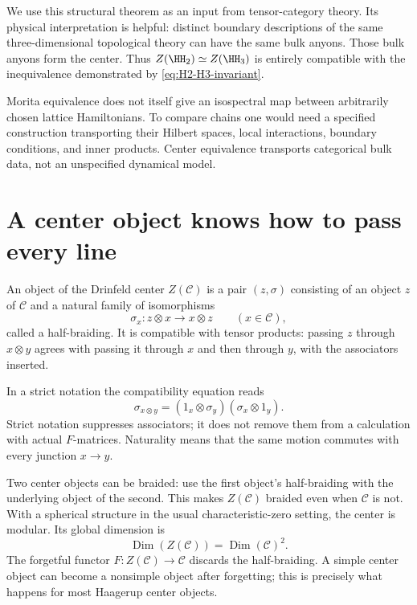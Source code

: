 We use this structural theorem as an input from tensor-category
theory.  Its physical interpretation is helpful: distinct boundary
descriptions of the same three-dimensional topological theory can
have the same bulk anyons.  Those bulk anyons form the center.
Thus $Z(\HH_2)\simeq Z(\HH_3)$ is entirely compatible with
the inequivalence demonstrated by \eqref{eq:H2-H3-invariant}.

Morita equivalence does not itself give an isospectral map between
arbitrarily chosen lattice Hamiltonians.  To compare chains one
would need a specified construction transporting their Hilbert
spaces, local interactions, boundary conditions, and inner products.
Center equivalence transports categorical bulk data, not an
unspecified dynamical model.

\section{A center object knows how to pass every line}

\begin{definition}
An object of the Drinfeld center $Z(\mathcal C)$ is a pair
$(z,\sigma)$ consisting of an object $z$ of $\mathcal C$ and
a natural family of isomorphisms
\[
 \sigma_x:z\otimes x\longrightarrow x\otimes z
 \qquad(x\in\mathcal C),
\]
called a half-braiding.  It is compatible with tensor products:
passing $z$ through $x\otimes y$ agrees with passing it through
$x$ and then through $y$, with the associators inserted.
\end{definition}

In a strict notation the compatibility equation reads
\begin{equation}
 \sigma_{x\otimes y}
 =(1_x\otimes\sigma_y)(\sigma_x\otimes1_y).
 \label{eq:half-braiding-strict}
\end{equation}
Strict notation suppresses associators; it does not remove them
from a calculation with actual $F$-matrices.  Naturality means that
the same motion commutes with every junction $x\to y$.

Two center objects can be braided: use the first object's
half-braiding with the underlying object of the second.  This makes
$Z(\mathcal C)$ braided even when $\mathcal C$ is not.  With a
spherical structure in the usual characteristic-zero setting, the
center is modular.  Its global dimension is
\begin{equation}
 \operatorname{Dim}(Z(\mathcal C))
 =\operatorname{Dim}(\mathcal C)^2.
 \label{eq:center-global-dimension}
\end{equation}
The forgetful functor $F:Z(\mathcal C)\to\mathcal C$ discards
the half-braiding.  A simple center object can become a nonsimple
object after forgetting; this is precisely what happens for most
Haagerup center objects.

